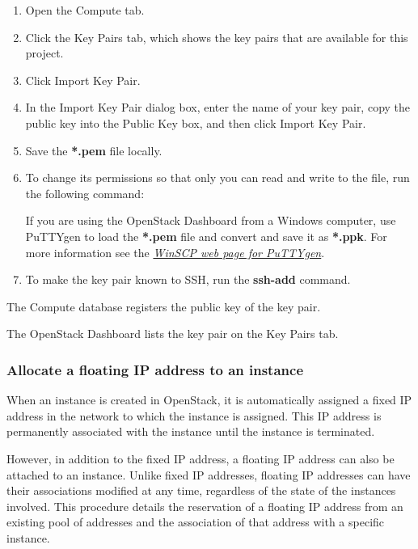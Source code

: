 {\begin{enumerate}
\item Open the Compute tab.
\item Click the Key Pairs tab, which shows the key pairs that are
  available for this project.
\item Click Import Key Pair.
\item In the Import Key Pair dialog box, enter the name of your key
  pair, copy the public key into the Public Key box, and then click
  Import Key Pair.
\item Save the \textbf{*.pem} file locally.
\item To change its permissions so that only you can read and write to
  the file, run the following command:

  \begin{prompt}
  \end{prompt}

   If you are using the \gls{OpenStack Dashboard} from a
  Windows computer, use PuTTYgen to load the \textbf{*.pem} file and
  convert and save it as \textbf{*.ppk}.  For more information see the
  \href{https://winscp.net/eng/docs/ui_puttygen}{\emph{WinSCP web page
      for PuTTYgen}}.

\item To make the key pair known to SSH, run the \textbf{ssh-add}
  command.

  \begin{prompt}
  \end{prompt}
\end{enumerate}

The Compute database registers the public key of the key pair.

The \gls{OpenStack Dashboard} lists the key pair on the Key Pairs tab.

\subsubsection{Allocate a floating IP address to an instance}\label{allocate-a-floating-ip-address-to-an-instance}

When an instance is created in \gls{OpenStack}, it is automatically assigned a
fixed IP address in the network to which the instance is assigned. This
IP address is permanently associated with the instance until the
instance is terminated.

However, in addition to the fixed IP address, a floating IP address can
also be attached to an instance. Unlike fixed IP addresses, floating IP
addresses can have their associations modified at any time, regardless
of the state of the instances involved. This procedure details the
reservation of a floating IP address from an existing pool of addresses
and the association of that address with a specific instance.

}
